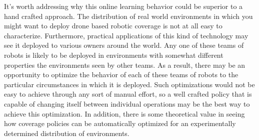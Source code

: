 It's worth addressing why this online learning behavior could be superior to a hand crafted approach. The distribution of real world environments in which you might want to deploy drone based robotic coverage is not at all easy to characterize. Furthermore, practical applications of this kind of  technology may see it deployed to various owners around the world. Any one of these teams of robots is likely to be deployed in environments with somewhat different properties the environments seen by other teams. As a result, there may be an opportunity to optimize the behavior of each of these teams of robots to the particular circumstances in which it is deployed. Such optimizations would not be easy to achieve through any sort of manual effort, so a well crafted policy that is capable of changing itself between individual operations may be the best way to achieve this optimization. In addition, there is some theoretical value in seeing how coverage policies can be automatically optimized for an experimentally determined distribution of environments.